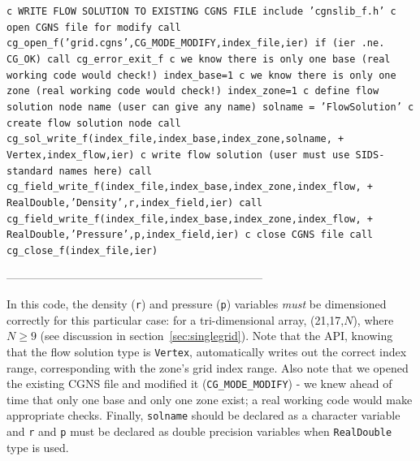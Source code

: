 \documentclass[12pt]{article}
\begin{document}
{\tt \noindent c  WRITE FLOW SOLUTION TO EXISTING CGNS FILE
\newline\indent      include 'cgnslib\_f.h'
\newline c  open CGNS file for modify
\newline\indent      call cg\_open\_f('grid.cgns',CG\_MODE\_MODIFY,index\_file,ier)
\newline\indent      if (ier .ne. CG\_OK) call cg\_error\_exit\_f
\newline c  we know there is only one base (real working code would check!)
\newline\indent      index\_base=1
\newline c  we know there is only one zone (real working code would check!)
\newline\indent      index\_zone=1
\newline c  define flow solution node name (user can give any name)
\newline\indent      solname = 'FlowSolution'
\newline c  create flow solution node
\newline\indent      call cg\_sol\_write\_f(index\_file,index\_base,index\_zone,solname,
\newline + \indent Vertex,index\_flow,ier)
\newline c  write flow solution (user must use SIDS-standard names here)
\newline\indent      call cg\_field\_write\_f(index\_file,index\_base,index\_zone,index\_flow,
\newline + \indent RealDouble,'Density',r,index\_field,ier)
\newline\indent      call cg\_field\_write\_f(index\_file,index\_base,index\_zone,index\_flow,
\newline + \indent RealDouble,'Pressure',p,index\_field,ier)
\newline c  close CGNS file
\newline\indent      call cg\_close\_f(index\_file,ier)}

--------------------------------------------------------------------

In this code, the density ({\tt r}) and pressure
({\tt p}) variables {\it must} be dimensioned
correctly for this particular case:  for a tri-dimensional array,
(21,17,$N$), where $N \geq 9$
(see discussion in section~\ref{sec:singlegrid}).  
Note that the API, knowing that the flow solution type is 
{\tt Vertex}, automatically writes out the correct index
range, corresponding with the zone's grid index range.
Also note that we opened the existing CGNS file and modified it 
({\tt CG\_MODE\_MODIFY}) - we
knew ahead of time that only one base and only one zone exist;
a real working code would make appropriate checks.  Finally,
{\tt solname} should be declared as a character variable and
{\tt r} and {\tt p} must be declared as double precision variables when
{\tt RealDouble} type is used.
\end{document}
